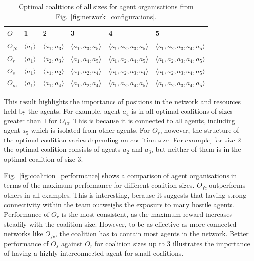 \documentclass{llncs}
\newcommand{\LD}{\langle}
\newcommand{\RD}{\rangle}
\begin{document}
\begin{table}[thb]
 \centering
 \begin{tabular}{ | l | l | l | l | l | l |}
    \hline
    $O$ & 1& 2 & 3 & 4 & 5 \\ \hline
    $O_{\mathit{fc}}$ & $\LD a_1 \RD$ & $\LD a_1, a_3 \RD$ & $\LD a_1, a_3, a_5 \RD$ & $\LD a_1, a_2, a_3, a_5 \RD$  & $\LD a_1, a_2, a_3, a_4, a_5 \RD$ \\ \hline
    $O_r$ & $\LD a_1 \RD$  & $\LD a_2, a_3 \RD$ & $\LD a_1, a_4, a_5 \RD$ & $\LD a_1, a_2, a_4, a_5 \RD$  & $\LD a_1, a_2, a_3, a_4, a_5 \RD$ \\ \hline
    $O_s$ & $\LD a_1 \RD$  & $\LD a_1, a_2 \RD$ & $\LD a_1, a_2, a_4 \RD$ & $\LD a_1, a_2, a_3, a_4 \RD$  & $\LD a_1, a_2, a_3, a_4, a_5 \RD$ \\ \hline
    $O_{ia}$ & $\LD a_1 \RD$  & $\LD a_1, a_4 \RD$ & $\LD a_1, a_2, a_4 \RD$ & $\LD a_1, a_2, a_4, a_5 \RD$  & $\LD a_1, a_2, a_3, a_4, a_5 \RD$ \\ \hline
\end{tabular}
\vspace{+4pt}
\caption{Optimal coalitions of all sizes for agent organisations from Fig.~\ref{fig:network_configurations}.}
\vspace{-0.4cm}
\label{tab:optimal_coalitions}
\end{table}
This result highlights the importance of positions in the network and resources held by the agents.
For example, agent $a_4$ is in all optimal coalitions of sizes greater than 1 for $O_{ia}$.
This is because it is connected to all agents, including agent $a_5$ which is isolated from other agents.
For $O_r$, however, the structure of the optimal coalition varies depending on coalition size. For example, for size 2 the optimal coalition consists of agents $a_2$ and $a_3$, but neither of them is in the optimal coalition of size 3.

Fig.~\ref{fig:coalition_performance} shows a comparison of agent organisations in terms of the maximum performance for different coalition sizes. $O_{\mathit{fc}}$ outperforms others in all examples. This is interesting, because it suggests that having strong connectivity within the team outweighs the exposure to many hostile agents. Performance of $O_r$ is the most consistent, as the maximum reward increases steadily with the coalition size.
However, to be as effective as more connected networks like $O_{\mathit{fc}}$, the coalition has to contain most agents in the network. Better performance of $O_s$ against $O_r$ for coalition sizes up to 3 illustrates the importance of having a highly interconnected agent for small coalitions.
\end{document}
